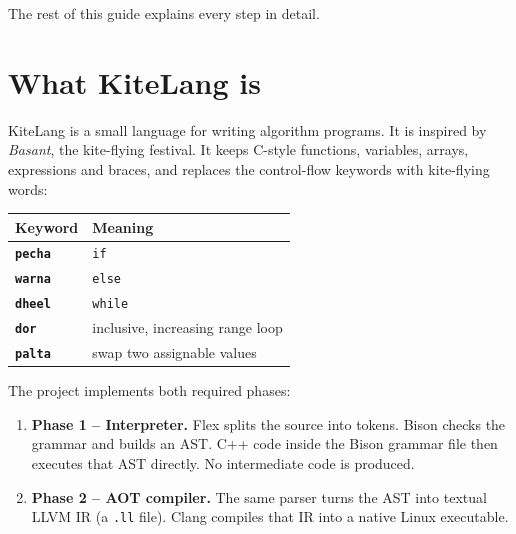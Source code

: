 \documentclass[11pt,a4paper]{article}
\newcommand{\kw}[1]{\texttt{\textcolor{cInput}{\textbf{#1}}}}
\newcommand{\fn}[1]{\texttt{#1}}
\begin{document}
The rest of this guide explains every step in detail.

\section{What KiteLang is}

KiteLang is a small language for writing algorithm programs. It is inspired by \emph{Basant}, the kite-flying festival. It keeps C-style functions, variables, arrays, expressions and braces, and replaces the control-flow keywords with kite-flying words:

\begin{center}
\begin{tabular}{>{\ttfamily}l l}
\toprule
\textrm{\textbf{Keyword}} & \textbf{Meaning}\\
\midrule
\kw{pecha} & \texttt{if}\\
\kw{warna} & \texttt{else}\\
\kw{dheel} & \texttt{while}\\
\kw{dor}   & inclusive, increasing range loop\\
\kw{palta} & swap two assignable values\\
\bottomrule
\end{tabular}
\end{center}

The project implements both required phases:

\begin{enumerate}
\item \textbf{Phase 1 -- Interpreter.} Flex splits the source into tokens. Bison checks the grammar and builds an AST. C++ code inside the Bison grammar file then executes that AST directly. No intermediate code is produced.
\item \textbf{Phase 2 -- AOT compiler.} The same parser turns the AST into textual LLVM IR (a \fn{.ll} file). Clang compiles that IR into a native Linux executable.
\end{enumerate}
\end{document}
